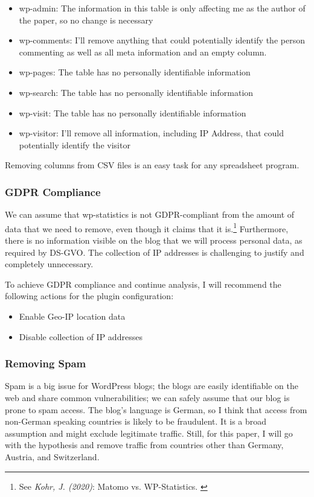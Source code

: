 \begin{itemize}
 \item wp-admin: The information in this table is only affecting me as the author of the paper, so no change is necessary
 \item wp-comments: I'll remove anything that could potentially identify the person commenting as well as all meta information and an empty column.
 \item wp-pages: The table has no personally identifiable information
 \item wp-search: The table has no personally identifiable information
 \item wp-visit: The table has no personally identifiable information
 \item wp-visitor: I'll remove all information, including IP Address, that could potentially identify the visitor
\end{itemize}

Removing columns from CSV files is an easy task for any spreadsheet program.

\subsubsection{GDPR Compliance}

We can assume that wp-statistics is not GDPR-compliant from the amount of data that we need to remove, even though it claims that it is.\footnote{See \textit{Kohr, J. (2020)}: Matomo vs. WP-Statistics. \cite{matomoBlog}} Furthermore, there is no information visible on the blog that we will process personal data, as required by DS-GVO. The collection of IP addresses is challenging to justify and completely unnecessary. 

To achieve GDPR compliance and continue analysis, I will recommend the following actions for the plugin configuration:

\begin{itemize}
 \item Enable Geo-IP location data
 \item Disable collection of IP addresses
\end{itemize}

\subsubsection{Removing Spam}

Spam is a big issue for WordPress blogs; the blogs are easily identifiable on the web and share common vulnerabilities; we can safely assume that our blog is prone to spam access. The blog's language is German, so I think that access from non-German speaking countries is likely to be fraudulent. It is a broad assumption and might exclude legitimate traffic. Still, for this paper, I will go with the hypothesis and remove traffic from countries other than Germany, Austria, and Switzerland.  


